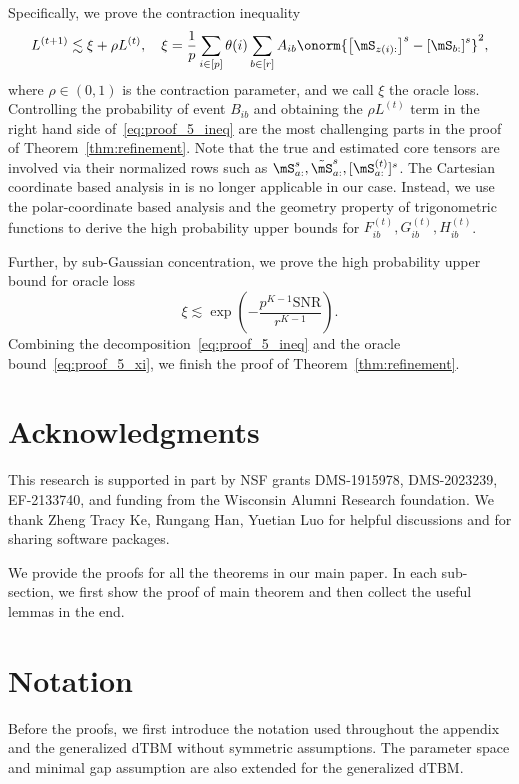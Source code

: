 \documentclass[lettersize,onecolumn,journal]{IEEEtran}
\theoremstyle{definition}
\theoremstyle{definition}
\newcommand{\of}[1]{\left(#1\right)}
\newcommand{\off}[1]{\left[#1\right]}
\begin{document}
Specifically, we prove the contraction inequality
\begin{equation}\label{eq:proof_5_ineq}
    L^{(t+1)} \lesssim \xi + \rho L^{(t)}, \quad \xi = \frac{1}{p}  \sum_{i \in [p]} \theta(i) \sum_{b \in [r]}  A_{ib} \onorm{ \off{ \mS_{ z(i):}  }^s - \off{ \mS_{b:}  }^s  }^2,
\end{equation}
where $\rho \in (0,1)$ is the contraction parameter, and we call $\xi$ the oracle loss. Controlling the probability of event $B_{ib}$ and obtaining the $\rho L^{(t)}$ term in the right hand side of~\eqref{eq:proof_5_ineq} are the most challenging parts in the proof of Theorem~\ref{thm:refinement}. Note that the true and estimated core tensors are involved via their normalized rows such as $\mS_{a:}^s, \tilde \mS_{a:}^s, [\mS^{(t)}_{a:}]^s$. The Cartesian coordinate based analysis in \cite{han2020exact} is no longer applicable in our case. Instead, we use the polar-coordinate based analysis and the geometry property of trigonometric functions to derive the high probability upper bounds for $F_{ib}^{(t)}, G_{ib}^{(t)}, H_{ib}^{(t)}$. 

Further, by sub-Gaussian concentration, we prove the high probability upper bound for oracle loss
\begin{equation}\label{eq:proof_5_xi}
    \xi  \lesssim \exp\of{- \frac{p^{K-1}\text{SNR}}{r^{K-1}}}.
\end{equation}
Combining the decomposition~\eqref{eq:proof_5_ineq} and the oracle bound~\eqref{eq:proof_5_xi}, we finish the proof of Theorem~\ref{thm:refinement}.


\section*{Acknowledgments}
This research is supported in part by NSF grants DMS-1915978, DMS-2023239, EF-2133740, and funding from the Wisconsin Alumni Research foundation. We thank Zheng Tracy Ke, Rungang Han, Yuetian Luo for helpful discussions and for sharing software packages. 






\newpage
\appendix


We provide the proofs for all the theorems in our main paper. In each sub-section, we first show the proof of main theorem and then collect the useful lemmas in the end.

\section*{Notation}
Before the proofs, we first introduce the notation used throughout the appendix and the generalized dTBM without symmetric assumptions. The parameter space and minimal gap assumption are also extended for the generalized dTBM. 
\end{document}
